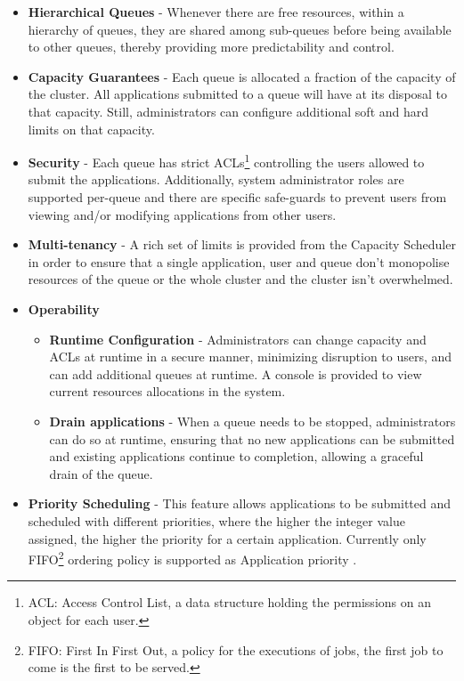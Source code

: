 \begin{itemize}

\item \textbf{Hierarchical Queues} - Whenever there are free resources, within a hierarchy of queues, they are shared among sub-queues before being available to other queues, thereby providing more predictability and control. 

\item \textbf{Capacity Guarantees} - Each queue is allocated a fraction of the capacity of the cluster. All applications submitted to a queue will have at its disposal to that capacity. Still, administrators can configure additional soft and hard limits on that capacity. 

\item \textbf{Security} - Each queue has strict ACLs\footnote{ACL: Access Control List, a data structure holding the permissions on an object for each user.} controlling the users allowed to submit the applications. Additionally, system administrator roles are supported per-queue and there are specific safe-guards to prevent users from viewing and/or modifying applications from other users.

\item \textbf{Multi-tenancy} - 
A rich set of limits is provided from the Capacity Scheduler in order to ensure that a single application, user and queue don't monopolise resources of the queue or the whole cluster and the cluster isn't overwhelmed.
\pagebreak
\item \textbf{Operability}
    \begin{itemize}
    \item \textbf{Runtime Configuration} - Administrators can change capacity and ACLs at runtime in a secure manner, minimizing disruption to users, and can add additional queues at runtime. A console is provided to view current resources allocations in the system.
    
    \item \textbf{Drain applications} - When a queue needs to be stopped, administrators can do so at runtime, ensuring that no new applications can be submitted and existing applications continue to completion, allowing a graceful drain of the queue.
    \end{itemize}

\item \textbf{Priority Scheduling} - This feature allows applications to be submitted and scheduled with different priorities, where the higher the integer value assigned, the higher the priority for a certain application. Currently only FIFO\footnote{FIFO: First In First Out, a policy for the executions of jobs, the first job to come is the first to be served.} ordering policy is supported as Application priority \cite{yarn_CapSched}.

\end{itemize}

